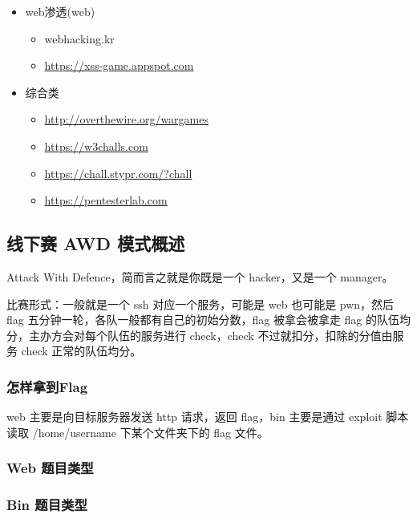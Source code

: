 \begin{itemize}
\begin{itemize}
        \item web渗透(web)
        \begin{itemize}
            \item webhacking.kr
            \item \href{https://xss-game.appspot.com}{https://xss-game.appspot.com}
        \end{itemize}
        
        \item 综合类
        \begin{itemize}
            \item \href{http://overthewire.org/wargames}{http://overthewire.org/wargames}
            \item \href{https://w3challs.com}{https://w3challs.com}
            \item \href{https://chall.stypr.com/?chall}{https://chall.stypr.com/?chall}
            \item \href{https://pentesterlab.com}{https://pentesterlab.com}
        \end{itemize}
    \end{itemize}
\end{itemize}

\subsection{线下赛 AWD 模式概述}
\indent \setlength{\parindent}{2em}

\indent Attack With Defence，简而言之就是你既是一个 hacker，又是一个 manager。

\indent 比赛形式：一般就是一个 ssh 对应一个服务，可能是 web 也可能是 pwn，然后 flag 五分钟一轮，各队一般都有自己的初始分数，flag 被拿会被拿走 flag 的队伍均分，主办方会对每个队伍的服务进行 check，check 不过就扣分，扣除的分值由服务 check 正常的队伍均分。

\subsubsection{怎样拿到Flag}
web 主要是向目标服务器发送 http 请求，返回 flag，bin 主要是通过 exploit 脚本读取 /home/username 下某个文件夹下的 flag 文件。

\subsubsection{Web 题目类型}

\subsubsection{Bin 题目类型}

